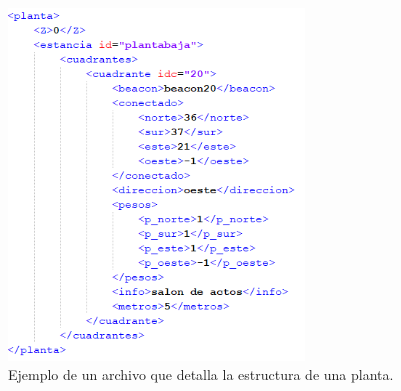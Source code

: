 \begin{figure}[t]
	\centering
	\includegraphics[width=0.7\textwidth]{Imagenes/Descripciondeltrabajo/plantaXML}
	\caption{Ejemplo de un archivo que detalla la estructura de una planta.}
	\label{fig:xmlplanta}
\end{figure}



